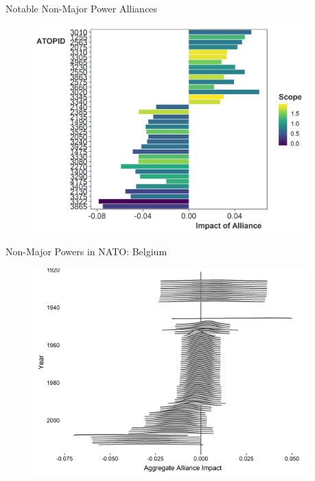 \documentclass{beamer}
\begin{document}
\begin{frame}{Notable Non-Major Power Alliances}


\begin{figure}
	\centering
		\includegraphics[width=0.95\textwidth]{non-zero-min.png}
	\label{fig:non-zero-min}
\end{figure}


\end{frame}



\begin{frame}{Non-Major Powers in NATO: Belgium}


\begin{figure}
	\centering
		\includegraphics[width=0.95\textwidth]{bel-agg-imp.png}
\end{figure}


\end{frame}
\end{document}
